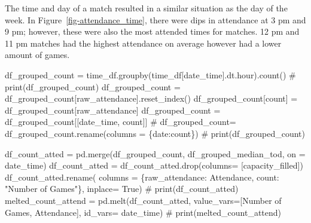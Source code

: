 \documentclass[
  letterpaper,
  DIV=11,
  numbers=noendperiod]{scrartcl}
\newenvironment{Shaded}{\begin{snugshade}}{\end{snugshade}}
\newcommand{\CommentTok}[1]{\textcolor[rgb]{0.37,0.37,0.37}{#1}}
\newcommand{\NormalTok}[1]{\textcolor[rgb]{0.00,0.23,0.31}{#1}}
\newcommand{\OperatorTok}[1]{\textcolor[rgb]{0.37,0.37,0.37}{#1}}
\newcommand{\StringTok}[1]{\textcolor[rgb]{0.13,0.47,0.30}{#1}}
\newcommand{\VariableTok}[1]{\textcolor[rgb]{0.07,0.07,0.07}{#1}}
\begin{document}
The time and day of a match resulted in a similar situation as the day
of the week. In Figure~\ref{fig-attendance_time}, there were dips in
attendance at 3 pm and 9 pm; however, these were also the most attended
times for matches. 12 pm and 11 pm matches had the highest attendance on
average however had a lower amount of games.

\begin{Shaded}
\begin{Highlighting}[]
\NormalTok{df\_grouped\_count }\OperatorTok{=}\NormalTok{ time\_df.groupby(time\_df[}\StringTok{\textquotesingle{}date\_time\textquotesingle{}}\NormalTok{].dt.hour).count()}
\CommentTok{\# print(df\_grouped\_count)}
\NormalTok{df\_grouped\_count }\OperatorTok{=}\NormalTok{ df\_grouped\_count[}\StringTok{\textquotesingle{}raw\_attendance\textquotesingle{}}\NormalTok{].reset\_index()}
\NormalTok{df\_grouped\_count[}\StringTok{\textquotesingle{}count\textquotesingle{}}\NormalTok{] }\OperatorTok{=}\NormalTok{ df\_grouped\_count[}\StringTok{\textquotesingle{}raw\_attendance\textquotesingle{}}\NormalTok{]}
\NormalTok{df\_grouped\_count }\OperatorTok{=}\NormalTok{ df\_grouped\_count[[}\StringTok{\textquotesingle{}date\_time\textquotesingle{}}\NormalTok{, }\StringTok{\textquotesingle{}count\textquotesingle{}}\NormalTok{]]}
\CommentTok{\# df\_grouped\_count= df\_grouped\_count.rename(columns = \{\textquotesingle{}date\textquotesingle{}:\textquotesingle{}count\textquotesingle{}\})}
\CommentTok{\# print(df\_grouped\_count)}

\NormalTok{df\_count\_atted }\OperatorTok{=}\NormalTok{ pd.merge(df\_grouped\_count, df\_grouped\_median\_tod, on }\OperatorTok{=} \StringTok{\textquotesingle{}date\_time\textquotesingle{}}\NormalTok{)}
\NormalTok{df\_count\_atted }\OperatorTok{=}\NormalTok{ df\_count\_atted.drop(columns}\OperatorTok{=}\NormalTok{ [}\StringTok{\textquotesingle{}capacity\_filled\textquotesingle{}}\NormalTok{])}
\NormalTok{df\_count\_atted.rename( columns }\OperatorTok{=}\NormalTok{ \{}\StringTok{\textquotesingle{}raw\_attendance\textquotesingle{}}\NormalTok{: }\StringTok{\textquotesingle{}Attendance\textquotesingle{}}\NormalTok{, }\StringTok{\textquotesingle{}count\textquotesingle{}}\NormalTok{: }\StringTok{"Number of Games"}\NormalTok{\}, inplace}\OperatorTok{=} \VariableTok{True}\NormalTok{)}
\CommentTok{\# print(df\_count\_atted)}
\NormalTok{melted\_count\_attend }\OperatorTok{=}\NormalTok{ pd.melt(df\_count\_atted, value\_vars}\OperatorTok{=}\NormalTok{[}\StringTok{\textquotesingle{}Number of Games\textquotesingle{}}\NormalTok{, }\StringTok{\textquotesingle{}Attendance\textquotesingle{}}\NormalTok{], id\_vars}\OperatorTok{=} \StringTok{\textquotesingle{}date\_time\textquotesingle{}}\NormalTok{)}
\CommentTok{\# print(melted\_count\_attend)}


\end{Highlighting}
\end{Shaded}
\end{document}
